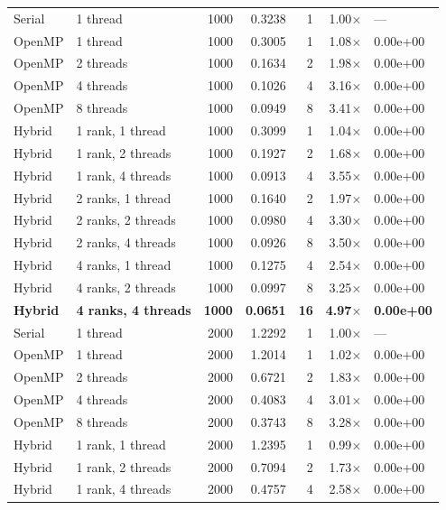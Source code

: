 \documentclass[11pt,a4paper]{article}
\begin{document}
\begin{longtable}{llrrrrl}
Serial & 1 thread          & 1000 & 0.3238 & 1  & 1.00$\times$ & --- \\
OpenMP & 1 thread          & 1000 & 0.3005 & 1  & 1.08$\times$ & 0.00e+00 \\
OpenMP & 2 threads         & 1000 & 0.1634 & 2  & 1.98$\times$ & 0.00e+00 \\
OpenMP & 4 threads         & 1000 & 0.1026 & 4  & 3.16$\times$ & 0.00e+00 \\
OpenMP & 8 threads         & 1000 & 0.0949 & 8  & 3.41$\times$ & 0.00e+00 \\
Hybrid & 1 rank, 1 thread  & 1000 & 0.3099 & 1  & 1.04$\times$ & 0.00e+00 \\
Hybrid & 1 rank, 2 threads & 1000 & 0.1927 & 2  & 1.68$\times$ & 0.00e+00 \\
Hybrid & 1 rank, 4 threads & 1000 & 0.0913 & 4  & 3.55$\times$ & 0.00e+00 \\
Hybrid & 2 ranks, 1 thread & 1000 & 0.1640 & 2  & 1.97$\times$ & 0.00e+00 \\
Hybrid & 2 ranks, 2 threads& 1000 & 0.0980 & 4  & 3.30$\times$ & 0.00e+00 \\
Hybrid & 2 ranks, 4 threads& 1000 & 0.0926 & 8  & 3.50$\times$ & 0.00e+00 \\
Hybrid & 4 ranks, 1 thread & 1000 & 0.1275 & 4  & 2.54$\times$ & 0.00e+00 \\
Hybrid & 4 ranks, 2 threads& 1000 & 0.0997 & 8  & 3.25$\times$ & 0.00e+00 \\
\textbf{Hybrid} & \textbf{4 ranks, 4 threads}& \textbf{1000} & \textbf{0.0651}
       & \textbf{16} & \textbf{4.97}$\boldsymbol{\times}$ & \textbf{0.00e+00} \\
\midrule
Serial & 1 thread          & 2000 & 1.2292 & 1  & 1.00$\times$ & --- \\
OpenMP & 1 thread          & 2000 & 1.2014 & 1  & 1.02$\times$ & 0.00e+00 \\
OpenMP & 2 threads         & 2000 & 0.6721 & 2  & 1.83$\times$ & 0.00e+00 \\
OpenMP & 4 threads         & 2000 & 0.4083 & 4  & 3.01$\times$ & 0.00e+00 \\
OpenMP & 8 threads         & 2000 & 0.3743 & 8  & 3.28$\times$ & 0.00e+00 \\
Hybrid & 1 rank, 1 thread  & 2000 & 1.2395 & 1  & 0.99$\times$ & 0.00e+00 \\
Hybrid & 1 rank, 2 threads & 2000 & 0.7094 & 2  & 1.73$\times$ & 0.00e+00 \\
Hybrid & 1 rank, 4 threads & 2000 & 0.4757 & 4  & 2.58$\times$ & 0.00e+00 \\

\end{longtable}
\end{document}
